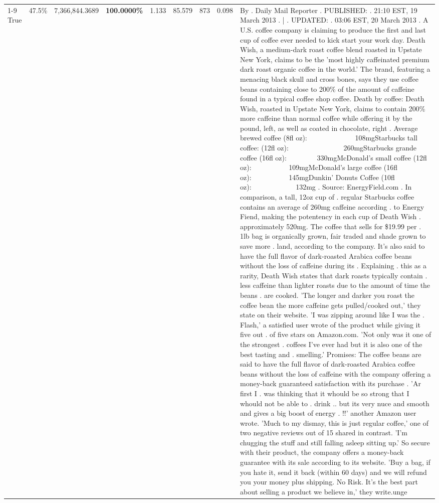 \begin{table}[H]
{\begin{tabular}{lllrlllll}
\cline{1-9} \cline{2-9}
True & 47.5\% & 7,366,844.3689 & \bfseries \color{red} 100.0000\% & 1.133 & 85.579 & 873 & 0.098 & By . Daily Mail Reporter . PUBLISHED: . 21:10 EST, 19 March 2013 . | . UPDATED: . 03:06 EST, 20 March 2013 . A U.S. coffee company is claiming to produce the first and last cup of coffee ever needed to kick start your work day. Death Wish, a medium-dark roast coffee blend roasted in Upstate New York, claims to be the 'most highly caffeinated premium dark roast organic coffee in the world.' The brand, featuring a menacing black skull and cross bones, says they use coffee beans containing close to 200\% of the amount of caffeine found in a typical coffee shop coffee. Death by coffee: Death Wish, roasted in Upstate New York, claims to contain 200\% more caffeine than normal coffee while offering it by the pound, left, as well as coated in chocolate, right . Average brewed coffee (8fl oz):              108mgStarbucks tall coffee: (12fl oz):                260mgStarbucks grande coffee (16fl oz):         330mgMcDonald's small coffee (12fl oz):           109mgMcDonald's large coffee (16fl oz):           145mgDunkin' Donuts Coffee (10fl oz):             132mg . Source: EnergyField.com . In comparison, a tall, 12oz cup of . regular Starbucks coffee contains an average of 260mg caffeine according . to Energy Fiend, making the potentency in each cup of Death Wish . approximately 520mg. The coffee that sells for \$19.99 per . 1lb bag is organically grown, fair traded and shade grown to save more . land, according to the company. It's also said to have the full flavor of dark-roasted Arabica coffee beans without the loss of caffeine during its . Explaining . this as a rarity, Death Wish states that dark roasts typically contain . less caffeine than lighter roasts due to the amount of time the beans . are cooked. 'The longer and darker you roast the coffee bean the more caffeine gets pulled/cooked out,' they state on their website. 'I was zipping around like I was the . Flash,' a satisfied user wrote of the product while giving it five out . of five stars on Amazon.com. 'Not only was it one of the strongest . coffees I've ever had but it is also one of the best tasting and . smelling.’ Promises: The coffee beans are said to have the full flavor of dark-roasted Arabica coffee beans without the loss of caffeine with the company offering a money-back guaranteed satisfaction with its purchase . 'Ar first I . was thinking that it whould be so strong that I whould not be able to . drink .. but its very nuce and smooth and gives a big boost of energy . !!' another Amazon user wrote. 'Much to my dismay, this is just regular coffee,' one of two negative reviews out of 15 shared in contrast. 'I'm chugging the stuff and still falling asleep sitting up.' So secure with their product, the company offers a money-back guarantee with its sale according to its website. 'Buy a bag, if you hate it, send it back (within 60 days) and we will refund you your money plus shipping. No Risk. It’s the best part about selling a product we believe in,' they write.unge \\

\end{tabular}}
\end{table}

